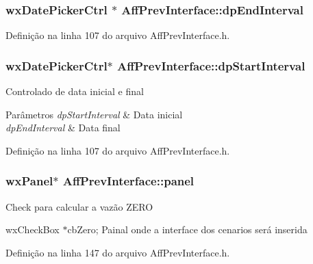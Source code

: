 \subsubsection[{dp\+End\+Interval}]{\setlength{\rightskip}{0pt plus 5cm}wx\+Date\+Picker\+Ctrl $\ast$ Aff\+Prev\+Interface\+::dp\+End\+Interval}\label{class_aff_prev_interface_a082d8e4599685945dcc466f002cae286}


Definição na linha 107 do arquivo Aff\+Prev\+Interface.\+h.

\subsubsection[{dp\+Start\+Interval}]{\setlength{\rightskip}{0pt plus 5cm}wx\+Date\+Picker\+Ctrl$\ast$ Aff\+Prev\+Interface\+::dp\+Start\+Interval}\label{class_aff_prev_interface_a9eb4003fa59d64cf7ddda3be9524a0fe}
Controlado de data inicial e final 
\begin{DoxyParams}{Parâmetros}
{\em dp\+Start\+Interval} & Data inicial \\
\hline
{\em dp\+End\+Interval} & Data final \\
\hline
\end{DoxyParams}


Definição na linha 107 do arquivo Aff\+Prev\+Interface.\+h.

\subsubsection[{panel}]{\setlength{\rightskip}{0pt plus 5cm}wx\+Panel$\ast$ Aff\+Prev\+Interface\+::panel}\label{class_aff_prev_interface_a63ade9c06416ff42728bc549e1310aaf}
Check para calcular a vazão Z\+E\+RO

wx\+Check\+Box $\ast$cb\+Zero; Painal onde a interface dos cenarios será inserida 

Definição na linha 147 do arquivo Aff\+Prev\+Interface.\+h.

